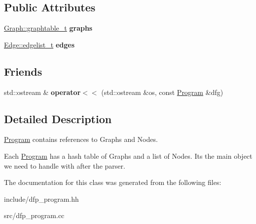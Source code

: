 \subsection*{Public Attributes}
\begin{DoxyCompactItemize}
\item 
\hyperlink{class_d_f_p_1_1_graph_ae35638adb932f3b7fd545ac09ea34c5a}{Graph\+::graphtable\+\_\+t} {\bfseries graphs}\hypertarget{class_d_f_p_1_1_program_a2a5742b3d9dfa492901729b919c22abc}{}\label{class_d_f_p_1_1_program_a2a5742b3d9dfa492901729b919c22abc}

\item 
\hyperlink{class_d_f_p_1_1_edge_a71ccd1900dbfda5591981064738f60af}{Edge\+::edgelist\+\_\+t} {\bfseries edges}\hypertarget{class_d_f_p_1_1_program_a4356cd8b3396652e8fde0104d980f176}{}\label{class_d_f_p_1_1_program_a4356cd8b3396652e8fde0104d980f176}

\end{DoxyCompactItemize}
\subsection*{Friends}
\begin{DoxyCompactItemize}
\item 
std\+::ostream \& {\bfseries operator$<$$<$} (std\+::ostream \&os, const \hyperlink{class_d_f_p_1_1_program}{Program} \&dfg)\hypertarget{class_d_f_p_1_1_program_a72cc270a3f767cf145203704dfe87d11}{}\label{class_d_f_p_1_1_program_a72cc270a3f767cf145203704dfe87d11}

\end{DoxyCompactItemize}


\subsection{Detailed Description}
\hyperlink{class_d_f_p_1_1_program}{Program} contains references to Graphs and Nodes. 

Each \hyperlink{class_d_f_p_1_1_program}{Program} has a hash table of Graphs and a list of Nodes. It\textquotesingle{}s the main object we need to handle with after the parser. 

The documentation for this class was generated from the following files\+:\begin{DoxyCompactItemize}
\item 
include/dfp\+\_\+program.\+hh\item 
src/dfp\+\_\+program.\+cc\end{DoxyCompactItemize}
